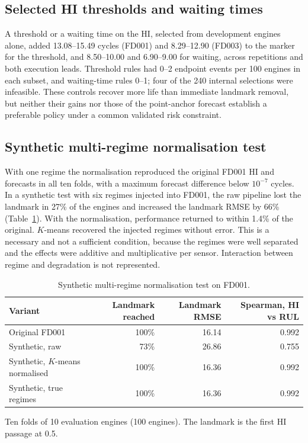 \documentclass[12pt]{article}
\newcommand{\tablenotes}[1]{\par\smallskip\begin{minipage}{\linewidth}\footnotesize\raggedright\setlength{\parindent}{0pt}#1\end{minipage}}
\begin{document}
\subsection*{Selected HI thresholds and waiting times}
A threshold or a waiting time on the HI, selected from development engines alone, added 13.08--15.49 cycles (FD001) and 8.29--12.90 (FD003) to the marker for the threshold, and 8.50--10.00 and 6.90--9.00 for waiting, across repetitions and both execution leads. Threshold rules had 0--2 endpoint events per 100 engines in each subset, and waiting-time rules 0--1; four of the 240 internal selections were infeasible. These controls recover more life than immediate landmark removal, but neither their gains nor those of the point-anchor forecast establish a preferable policy under a common validated risk constraint.

\subsection*{Synthetic multi-regime normalisation test}
With one regime the normalisation reproduced the original FD001 HI and forecasts in all ten folds, with a maximum forecast difference below $10^{-7}$ cycles. In a synthetic test with six regimes injected into FD001, the raw pipeline lost the landmark in 27\% of the engines and increased the landmark RMSE by 66\% (Table~\ref{tab:regime-test}). With the normalisation, performance returned to within 1.4\% of the original. $K$-means recovered the injected regimes without error. This is a necessary and not a sufficient condition, because the regimes were well separated and the effects were additive and multiplicative per sensor. Interaction between regime and degradation is not represented.

\begin{table}[htbp]
\centering
\caption{Synthetic multi-regime normalisation test on FD001.}
\label{tab:regime-test}
\footnotesize
\setlength{\tabcolsep}{3pt}
\begin{tabularx}{\linewidth}{@{}Xrrr@{}}
\toprule
Variant & Landmark reached & Landmark RMSE & Spearman, HI vs RUL \\
\midrule
Original FD001 & 100\% & 16.14 & 0.992 \\
Synthetic, raw & 73\% & 26.86 & 0.755 \\
Synthetic, $K$-means normalised & 100\% & 16.36 & 0.992 \\
Synthetic, true regimes & 100\% & 16.36 & 0.992 \\
\bottomrule
\end{tabularx}
\tablenotes{Ten folds of 10 evaluation engines (100 engines). The landmark is the first HI passage at 0.5.}
\end{table}
\end{document}
